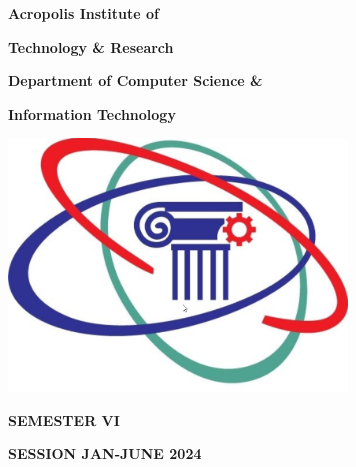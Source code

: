 \documentclass[12pt,,a4paper]{article}
\begin{document}
\thispagestyle{empty}
\vspace*{-3cm}

\begin{center}
\textbf{\fontsize{22}{\baselineskip}\selectfont Acropolis Institute of }

\bigskip

\textbf{\fontsize{22}{\baselineskip}\selectfont   Technology \& Research}

\bigskip

\textbf{\fontsize{14}{\baselineskip}\selectfont Department of Computer Science \& }

\bigskip

\textbf{\fontsize{14}{\baselineskip}\selectfont Information Technology }

\bigskip


\bigskip

\includegraphics[width=9cm]{logo-3.png}
\vspace*{1cm}
\bigskip

\textbf{\fontsize{20}{\baselineskip}\selectfont SEMESTER VI}

\bigskip

\textbf{\fontsize{20}{\baselineskip}\selectfont SESSION JAN-JUNE 2024}

\bigskip

\bigskip

\bigskip


\bigskip


\end{center}

\bigskip


\bigskip

\end{document}

